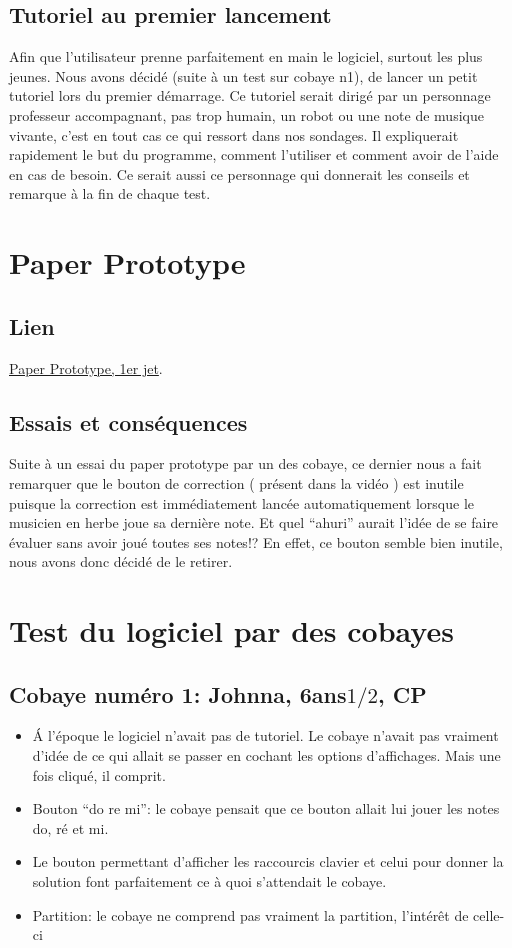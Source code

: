 \documentclass{article}
\begin{document}
\subsection{Tutoriel au premier lancement}

Afin que l'utilisateur prenne parfaitement en main le logiciel, surtout les plus jeunes. Nous avons décidé (suite à un test sur cobaye n1),
de lancer un petit tutoriel lors du premier démarrage. Ce tutoriel serait dirigé par un personnage professeur accompagnant,
pas trop humain, un robot ou une note de musique vivante, c'est en tout cas ce qui ressort dans nos sondages.
Il expliquerait rapidement le but du programme, comment l'utiliser et comment avoir de l'aide en cas de besoin.
Ce serait aussi ce personnage qui donnerait les conseils et remarque à la fin de chaque test.





\section{Paper Prototype}
\subsection{Lien}
\href{https://www.youtube.com/watch?v=gwFMDVW2Swo}{Paper Prototype, 1er jet}.
\subsection{Essais et conséquences}
Suite à un essai du paper prototype par un des cobaye, ce dernier nous a fait remarquer que le bouton de correction ( présent dans la vidéo )
est inutile puisque la correction est immédiatement lancée automatiquement lorsque le musicien en herbe joue sa dernière note. Et 
quel ``ahuri'' aurait l'idée de se faire évaluer sans avoir joué toutes ses notes!?
En effet, ce bouton semble bien inutile, nous avons donc décidé de le retirer.
\section{Test du logiciel par des cobayes}
\subsection{Cobaye numéro 1: Johnna, 6ans$1/2$, CP}

\begin{itemize}
\item \'A l'époque le logiciel n'avait pas de tutoriel. Le cobaye n'avait pas vraiment d'idée de ce qui allait se passer en cochant les 
options d'affichages. Mais une fois cliqué, il comprit.
\item Bouton ``do re mi'': le cobaye pensait que ce bouton allait lui jouer les notes do, ré et mi.
\item Le bouton permettant d'afficher les raccourcis clavier et celui pour donner la solution font parfaitement ce à quoi s'attendait
le cobaye.
\item Partition: le cobaye ne comprend pas vraiment la partition, l'intérêt de celle-ci
\end{itemize}
\end{document}
